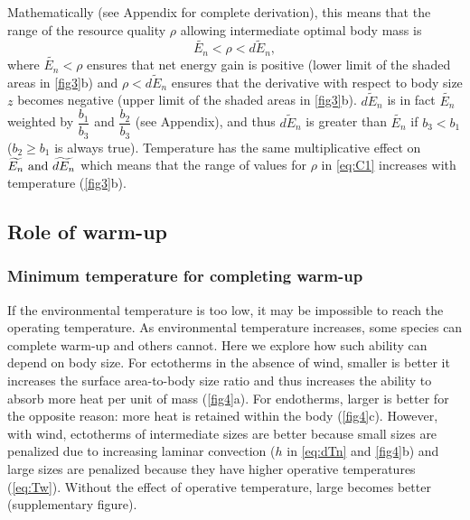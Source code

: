 Mathematically (see Appendix for complete derivation), this means that the range of the resource quality $\rho$ allowing intermediate optimal body mass is %
\begin{equation}\label{eq:C1}
	\widetilde{E_n} < \rho < \widetilde{dE_n},
\end{equation}
where $\widetilde{E_n} < \rho $ ensures that net energy gain is positive (lower limit of the shaded areas in \cref{fig3}b) and $\rho < \widetilde{dE_n}$ ensures that the derivative with respect to body size $z$ becomes negative (upper limit of the shaded areas in \cref{fig3}b).
$\widetilde{dE_n}$ is in fact $\widetilde{E_n}$ weighted by $\dfrac{b_1}{b_3}$  and $\dfrac{b_2}{b_3}$ (see Appendix), and thus $\widetilde{dE_n}$ is greater than $\widetilde{E_n}$ if  $b_3 < b_1$ ($b_2 \geq b_1$ is always true). 
Temperature has the same multiplicative effect on $\widetilde{E_n}\textnormal{ and }\widetilde{dE_n}$ which means that the range of values for $\rho$ in \cref{eq:C1} increases with temperature (\cref{fig3}b).
\subsection*{Role of warm-up}
\subsubsection*{Minimum temperature for completing warm-up}
If the environmental temperature is too low, it may be impossible to reach the operating temperature. 
As environmental temperature increases, some species can complete warm-up and others cannot. %
Here we explore how such ability can depend on body size.
For ectotherms in the absence of wind, smaller is better it increases the surface area-to-body size ratio and thus increases the ability to absorb more heat per unit of mass  (\cref{fig4}a). 
For endotherms, larger is better for the opposite reason: more heat is retained within the body  (\cref{fig4}c). 
However, with wind, ectotherms of intermediate sizes are better because small sizes are penalized due to increasing laminar convection ($h$ in \cref{eq:dTn} and \cref{fig4}b)  and large sizes are penalized because they have higher operative temperatures (\cref{eq:Tw}). 
Without the effect of operative temperature, large becomes better (supplementary figure).
